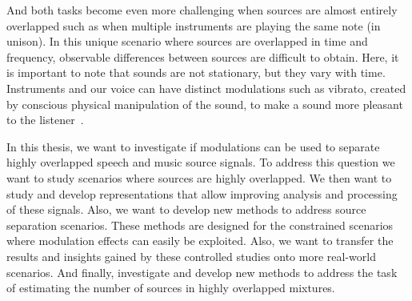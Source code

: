 And both tasks become even more challenging when sources are almost entirely overlapped such as when multiple instruments are playing the same note (in unison).
In this unique scenario where sources are overlapped in time and frequency, observable differences between sources are difficult to obtain.
Here, it is important to note that sounds are not stationary, but they vary with time.
Instruments and our voice can have distinct modulations such as vibrato, created by conscious physical manipulation of the sound, to make a sound more pleasant to the listener~\cite{fletcher01}.
\par
In this thesis, we want to investigate if modulations can be used to separate highly overlapped speech and music source signals.
To address this question we want to study scenarios where sources are highly overlapped.
We then want to study and develop representations that allow improving analysis and processing of these signals.
Also, we want to develop new methods to address source separation scenarios.
These methods are designed for the constrained scenarios where modulation effects can easily be exploited.
Also, we want to transfer the results and insights gained by these controlled studies onto more real-world scenarios.
And finally, investigate and develop new methods to address the task of estimating the number of sources in highly overlapped mixtures.




